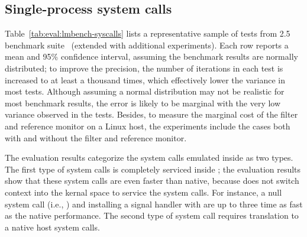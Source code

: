 \subsection{Single-process system calls}
\label{eval:perf:syscalls}


Table~\ref{tab:eval:lmbench-syscalls} lists 
a representative sample of 
tests from \lmbench{} 2.5 benchmark suite~\cite{McVoy:lmbench}
(extended with additional experiments).
Each row reports a mean and 95\% confidence interval,
assuming the benchmark results are normally distributed;
to improve the precision,
the number of iterations in each test is increased to at least a thousand times, which effectively lower the variance
in most tests.
Although assuming a normal distribution may not be realistic for most benchmark results,
the error is likely to be marginal with the very low variance
observed in the tests.
Besides, to measure the marginal cost of the \seccomp{} filter and reference monitor on a Linux host,
the experiments include the cases both with
and without the \seccomp{} filter and reference monitor.


The evaluation results categorize
the system calls emulated inside \thelibos{}
as two types.
The first type of system calls is completely serviced inside \thelibos{};
the evaluation results show that these system calls are even faster than native, because \thelibos{} does not switch context into the kernal space
to service the system calls.
For instance,
a null system call (i.e., ) and installing a signal handler with 
are up to three time as fast as the native performance.
The second type of system call requires translation to a native host system calls.

